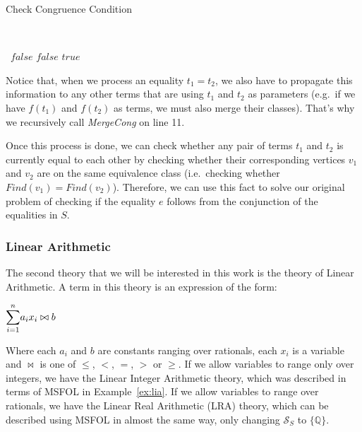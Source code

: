 \begin{algorithm}[H]
\caption{Check Congruence Condition}~\label{cong_cond}
\begin{algorithmic}[1]
    \State\Return~$false$
  \EndIf
      \State\Return $false$
    \EndIf
  \EndFor
  \State\Return $true$
  \EndFunction
\end{algorithmic}
\end{algorithm}

Notice that, when we process an equality $t_{1} = t_{2}$, we also have to propagate this information to any other terms that are using $t_{1}$ and $t_{2}$ as parameters (e.g.~if we have $f(t_{1})$ and $f(t_{2})$ as terms, we must also merge their classes). That's why we recursively call \textit{MergeCong} on line 11.

Once this process is done, we can check whether any pair of terms $t_{1}$ and $t_{2}$ is currently equal to each other by checking whether their corresponding vertices $v_{1}$ and $v_{2}$ are on the same equivalence class (i.e.\ checking whether $Find(v_{1}) = Find(v_{2})$). Therefore, we can use this fact to solve our original problem of checking if the equality $e$ follows from the conjunction of the equalities in $S$.

\subsubsection{Linear Arithmetic}

The second theory that we will be interested in this work is the theory of Linear Arithmetic. A term in this theory is an expression of the form:
\begin{center}
  $\mathlarger{\sum}_{i = 1}^{n} a_{i} x_{i} \bowtie b$
\end{center}

Where each $a_{i}$ and $b$ are constants ranging over rationals, each $x_{i}$ is a variable and $\bowtie$ is one of $\le$, $<$, $=$, $>$ or $\ge$. If we allow variables to range only over integers, we have the Linear Integer Arithmetic theory, which was described in terms of MSFOL in Example~\ref{ex:lia}. If we allow variables to range over rationals, we have the Linear Real Arithmetic (LRA) theory, which can be described using MSFOL in almost the same way, only changing $\mathcal{S}_{S}$ to $\{\mathbb{Q}\}$. 

